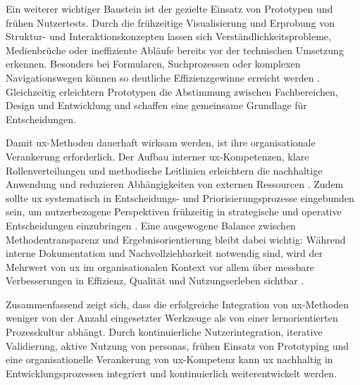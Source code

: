 Ein weiterer wichtiger Baustein ist der gezielte Einsatz von Prototypen und frühen Nutzertests. Durch die frühzeitige Visualisierung und Erprobung von Struktur- und Interaktionskonzepten lassen sich Verständlichkeitsprobleme, Medienbrüche oder ineffiziente Abläufe bereits vor der technischen Umsetzung erkennen. Besonders bei Formularen, Suchprozessen oder komplexen Navigationswegen können so deutliche Effizienzgewinne erreicht werden \cite{425:Wroblewski2008}. Gleichzeitig erleichtern Prototypen die Abstimmung zwischen Fachbereichen, Design und Entwicklung und schaffen eine gemeinsame Grundlage für Entscheidungen.

Damit \Gls{ux}-Methoden dauerhaft wirksam werden, ist ihre organisationale Verankerung erforderlich. Der Aufbau interner \Gls{ux}-Kompetenzen, klare Rollenverteilungen und methodische Leitlinien erleichtern die nachhaltige Anwendung und reduzieren Abhängigkeiten von externen Ressourcen \cite{300:FraunhoferIESE2018}. Zudem sollte \Gls{ux} systematisch in Entscheidungs- und Priorisierungsprozesse eingebunden sein, um nutzerbezogene Perspektiven frühzeitig in strategische und operative Entscheidungen einzubringen \cite{417:Benyon2019}. Eine ausgewogene Balance zwischen Methodentransparenz und Ergebnisorientierung bleibt dabei wichtig: Während interne Dokumentation und Nachvollziehbarkeit notwendig sind, wird der Mehrwert von \Gls{ux} im organisationalen Kontext vor allem über messbare Verbesserungen in Effizienz, Qualität und Nutzungserleben sichtbar \cite{301:Infragistics2015,100:WhartonUX2015}.

Zusammenfassend zeigt sich, dass die erfolgreiche Integration von \Gls{ux}-Methoden weniger von der Anzahl eingesetzter Werkzeuge als von einer lernorientierten Prozesskultur abhängt. Durch kontinuierliche Nutzerintegration, iterative Validierung, aktive Nutzung von \Gls{personas}, frühen Einsatz von Prototyping und eine organisationelle Verankerung von \Gls{ux}-Kompetenz kann \Gls{ux} nachhaltig in Entwicklungsprozessen integriert und kontinuierlich weiterentwickelt werden.

